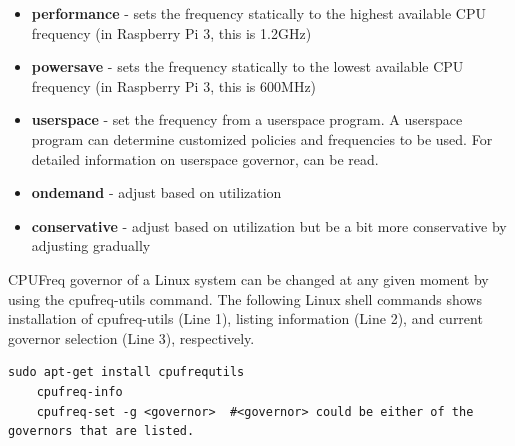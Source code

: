 \begin{itemize}
	\item \textbf{performance} - sets the frequency statically to the highest available CPU frequency (in Raspberry Pi 3, this is 1.2GHz)
	\item \textbf{powersave} - sets the frequency statically to the lowest available CPU frequency (in Raspberry Pi 3, this is 600MHz)
	\item \textbf{userspace} - set the frequency from a userspace program. A userspace program can determine customized policies and frequencies to be used. For detailed information on userspace governor, \cite{gateworks} can be read.
	\item \textbf{ondemand} - adjust based on utilization
	\item \textbf{conservative} - adjust based on utilization but be a bit more conservative by adjusting gradually
\end{itemize}

CPUFreq governor of a Linux system can be changed at any given moment by using the cpufreq-utils command. The following Linux shell commands shows installation of cpufreq-utils (Line 1), listing information (Line 2), and current governor selection (Line 3), respectively.
\begin{lstlisting}[style=bash]
	sudo apt-get install cpufrequtils
	cpufreq-info
	cpufreq-set -g <governor>  #<governor> could be either of the governors that are listed.
\end{lstlisting}


